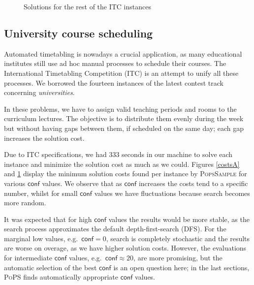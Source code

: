 \documentclass{ws-ijait}
\begin{document}
\begin{figure}
  \centering
  
  \caption{Solutions for the rest of the ITC instances\label{costsB}}
\end{figure}

\subsection{University course scheduling\label{ITC}}

Automated timetabling is nowadays a crucial application, as many educational institutes still use ad hoc manual processes to schedule their courses. The International Time\-ta\-bl\-in\-g Competition (ITC) is an attempt to unify all these processes. We borrowed the fourteen instances of the latest contest track concerning \emph{universities}.\cite{itc-agenda}

In these problems, we have to assign valid teaching periods and rooms to the curriculum lectures. The objective is to distribute them evenly during the week but without having gaps between them, if scheduled on the same day; each gap increases the solution cost.\cite{pothitos-ictai2012}

Due to ITC specifications, we had 333 seconds in our machine to solve each instance and minimize the solution cost as much as we could. Figures \ref{costsA} and \ref{costsB} display the minimum solution costs found per instance by \textsc{PopsSample} for various $\mathsf{conf}$ values. We observe that as $\mathsf{conf}$ increases the costs tend to a specific number, whilst for small $\mathsf{conf}$ values we have fluctuations because search becomes more random.


It was expected that for high $\mathsf{conf}$ values the results would be more stable, as the search process approximates the default depth-first-search (DFS). For the marginal low values, e.g.\ $\mathsf{conf} = 0$, search is completely stochastic and the results are worse on overage, as we have higher solution costs. However, the evaluations for intermediate $\mathsf{conf}$ values, e.g.\ $\mathsf{conf} \approx 20$, are more promising, but the automatic selection of the best $\mathsf{conf}$ is an open question here; in the last sections, \textsc{PoPS} finds automatically appropriate $\mathsf{conf}$ values.
\end{document}
